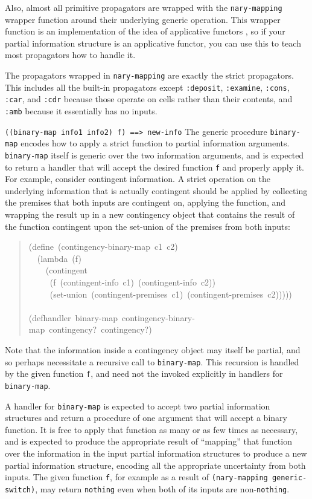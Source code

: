 \documentclass[12pt,letterpaper,english]{article}
\begin{document}
Also, almost all primitive propagators are wrapped
with the \texttt{nary-mapping} wrapper function around their underlying
generic operation.  This wrapper function is an implementation of the
idea of applicative functors \cite{mcbride-paterson-2008-applicative-functors},
so if your partial information structure is an applicative functor, you can
use this to teach most propagators how to handle it.

The propagators wrapped in \texttt{nary-mapping} are exactly the strict
propagators.  This includes all the built-in propagators except
\texttt{:deposit}, \texttt{:examine}, \texttt{:cons}, \texttt{:car}, and \texttt{:cdr} because
those operate on cells rather than their contents, and \texttt{:amb}
because it essentially has no inputs.

\texttt{((binary-map info1 info2) f)  ==>  new-info}
The generic procedure \texttt{binary-map} encodes how to apply a strict
function to partial information arguments.  \texttt{binary-map} itself is
generic over the two information arguments, and is expected to return
a handler that will accept the desired function \texttt{f} and properly
apply it.  For example, consider contingent information.  A strict
operation on the underlying information that is actually contingent
should be applied by collecting the premises that both inputs are
contingent on, applying the function, and wrapping the result up in a
new contingency object that contains the result of the function
contingent upon the set-union of the premises from both inputs:
\begin{quote}{\ttfamily \raggedright \noindent
(define~(contingency-binary-map~c1~c2)~\\
~~(lambda~(f)~\\
~~~~(contingent~\\
~~~~~(f~(contingent-info~c1)~(contingent-info~c2))~\\
~~~~~(set-union~(contingent-premises~c1)~(contingent-premises~c2)))))~\\
~\\
(defhandler~binary-map~contingency-binary-map~contingency?~contingency?)
}\end{quote}

Note that the information inside a contingency object may itself be
partial, and so perhaps necessitate a recursive call to
\texttt{binary-map}.  This recursion is handled by the given function
\texttt{f}, and need not the invoked explicitly in handlers for
\texttt{binary-map}.

A handler for \texttt{binary-map} is expected to accept two partial
information structures and return a procedure of one argument that
will accept a binary function.  It is free to apply that function as
many or as few times as necessary, and is expected to produce the
appropriate result of ``mapping'' that function over the information in
the input partial information structures to produce a new partial
information structure, encoding all the appropriate uncertainty from
both inputs.  The given function \texttt{f}, for example as a result of
\texttt{(nary-mapping generic-switch)}, may return \texttt{nothing} even when
both of its inputs are non-\texttt{nothing}.
\end{document}
